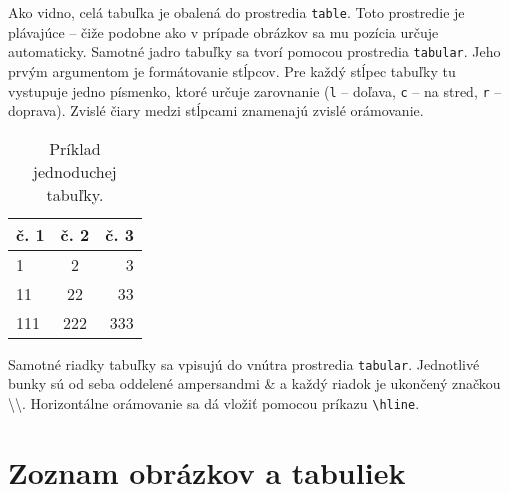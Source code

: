 Ako vidno, celá tabuľka je obalená do prostredia \texttt{table}. Toto prostredie je plávajúce -- čiže podobne ako v prípade obrázkov sa mu pozícia určuje automaticky. Samotné jadro tabuľky sa tvorí pomocou prostredia \texttt{tabular}. Jeho prvým argumentom je formátovanie stĺpcov. Pre každý stĺpec tabuľky tu vystupuje jedno písmenko, ktoré určuje zarovnanie (\texttt{l} -- doľava, \texttt{c} -- na stred, \texttt{r} -- doprava). Zvislé čiary medzi stĺpcami znamenajú zvislé orámovanie.

\begin{table}
\centering
\caption{Príklad jednoduchej tabuľky.}
\label{tab:priklad}
\begin{tabular}{|l|c|r|}
\hline
\textbf{č. 1} & \textbf{č. 2} &  \textbf{č. 3} \\
\hline
1 & 2 & 3 \\
11 & 22 & 33 \\
111 & 222 & 333 \\
\hline
\end{tabular}
\end{table}

Samotné riadky tabuľky sa vpisujú do vnútra prostredia \texttt{tabular}. Jednotlivé bunky sú od seba oddelené ampersandmi \& a každý riadok je ukončený značkou \textbackslash\textbackslash. Horizontálne orámovanie sa dá vložiť pomocou príkazu \texttt{{\textbackslash}hline}.


%
%
%
%
%
%
%
%
%
%
%


\section{Zoznam obrázkov a tabuliek}

